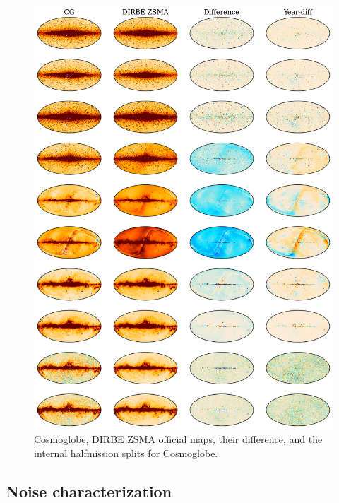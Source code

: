 \documentclass{aa}
\begin{document}
\begin{figure}
	\centering
	\includegraphics[width=\linewidth]{figs/diff_grid.png}
	\caption{Cosmoglobe, DIRBE ZSMA official maps, their difference, and the internal halfmission splits for Cosmoglobe.}
	\label{fig:diff_grid}
\end{figure}


\subsection{Noise characterization}
\end{document}

